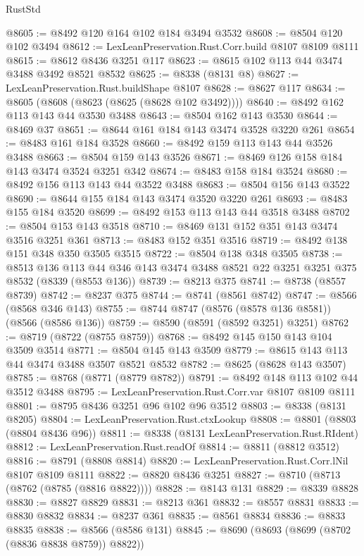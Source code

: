 \begin{lexlean}{RustStd}
\begin{coremodule}
@8605 := @8492 @120 @164 @102 @184 @3494 @3532
@8608 := @8504 @120 @102 @3494
@8612 := LexLeanPreservation.Rust.Corr.build @8107 @8109 @8111
@8615 := @8612 @8436 @3251 @117
@8623 := @8615 @102 @113 @44 @3474 @3488 @3492 @8521 @8532
@8625 := @8338 (@8131 @8)
@8627 := LexLeanPreservation.Rust.buildShape @8107
@8628 := @8627 @117
@8634 := @8605 (@8608 (@8623 (@8625 (@8628 @102 @3492))))
@8640 := @8492 @162 @113 @143 @44 @3530 @3488
@8643 := @8504 @162 @143 @3530
@8644 := @8469 @37
@8651 := @8644 @161 @184 @143 @3474 @3528 @3220 @261
@8654 := @8483 @161 @184 @3528
@8660 := @8492 @159 @113 @143 @44 @3526 @3488
@8663 := @8504 @159 @143 @3526
@8671 := @8469 @126 @158 @184 @143 @3474 @3524 @3251 @342
@8674 := @8483 @158 @184 @3524
@8680 := @8492 @156 @113 @143 @44 @3522 @3488
@8683 := @8504 @156 @143 @3522
@8690 := @8644 @155 @184 @143 @3474 @3520 @3220 @261
@8693 := @8483 @155 @184 @3520
@8699 := @8492 @153 @113 @143 @44 @3518 @3488
@8702 := @8504 @153 @143 @3518
@8710 := @8469 @131 @152 @351 @143 @3474 @3516 @3251 @361
@8713 := @8483 @152 @351 @3516
@8719 := @8492 @138 @151 @348 @350 @3505 @3515
@8722 := @8504 @138 @348 @3505
@8738 := @8513
    @136
    @113
    @44
    @346
    @143
    @3474
    @3488
    @8521
    @22
    @3251
    @3251
    @375
    @8532
    (@8339 (@8553 @136))
@8739 := @8213 @375
@8741 := @8738 (@8557 @8739)
@8742 := @8237 @375
@8744 := @8741 (@8561 @8742)
@8747 := @8566 (@8568 @346 @143)
@8755 := @8744 @8747 (@8576 (@8578 @136 @8581)) (@8566 (@8586 @136))
@8759 := @8590 (@8591 (@8592 @3251) @3251)
@8762 := @8719 (@8722 (@8755 @8759))
@8768 := @8492 @145 @150 @143 @104 @3509 @3514
@8771 := @8504 @145 @143 @3509
@8779 := @8615 @143 @113 @44 @3474 @3488 @3507 @8521 @8532
@8782 := @8625 (@8628 @143 @3507)
@8785 := @8768 (@8771 (@8779 @8782))
@8791 := @8492 @148 @113 @102 @44 @3512 @3488
@8795 := LexLeanPreservation.Rust.Corr.var @8107 @8109 @8111
@8801 := @8795 @8436 @3251 @96 @102 @96 @3512
@8803 := @8338 (@8131 @8205)
@8804 := LexLeanPreservation.Rust.ctxLookup
@8808 := @8801 (@8803 (@8804 @8436 @96))
@8811 := @8338 (@8131 LexLeanPreservation.Rust.RIdent)
@8812 := LexLeanPreservation.Rust.readOf
@8814 := @8811 (@8812 @3512)
@8816 := @8791 (@8808 @8814)
@8820 := LexLeanPreservation.Rust.Corr.lNil @8107 @8109 @8111
@8822 := @8820 @8436 @3251
@8827 := @8710 (@8713 (@8762 (@8785 (@8816 @8822))))
@8828 := @8143 @131
@8829 := @8339 @8828
@8830 := @8827 @8829
@8831 := @8213 @361
@8832 := @8557 @8831
@8833 := @8830 @8832
@8834 := @8237 @361
@8835 := @8561 @8834
@8836 := @8833 @8835
@8838 := @8566 (@8586 @131)
@8845 := @8690 (@8693 (@8699 (@8702 (@8836 @8838 @8759)) @8822))

\end{coremodule}
\end{lexlean}

